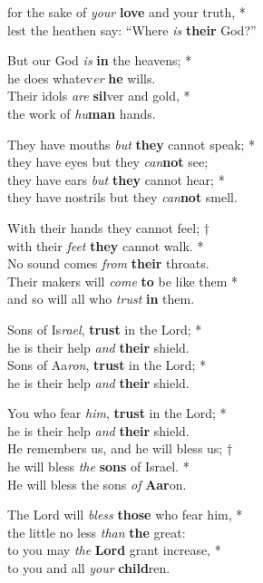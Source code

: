 for the sake of \emph{your} \textbf{love} and your truth, *\\
lest the heathen say: “Where \emph{is} \textbf{their} God?”

But our God \emph{is} \textbf{in} the heavens; *\\
he does whatev\emph{er} \textbf{he} wills.\\
Their idols \emph{are} \textbf{sil}ver and gold, *\\
the work of \emph{hu}\textbf{man} hands.

They have mouths \emph{but} \textbf{they} cannot speak; *\\
they have eyes but they \emph{can}\textbf{not} see;\\
they have ears \emph{but} \textbf{they} cannot hear; *\\
they have nostrils but they \emph{can}\textbf{not} smell.

With their hands they cannot feel; †\\
with their \emph{feet} \textbf{they} cannot walk. *\\
No sound comes \emph{from} \textbf{their} throats.\\
Their makers will \emph{come} \textbf{to} be like them *\\
and so will all who \emph{trust} \textbf{in} them.

Sons of Is\emph{rael}, \textbf{trust} in the Lord; *\\
he is their help \emph{and} \textbf{their} shield.\\
Sons of Aa\emph{ron}, \textbf{trust} in the Lord; *\\
he is their help \emph{and} \textbf{their} shield.

You who fear \emph{him}, \textbf{trust} in the Lord; *\\
he is their help \emph{and} \textbf{their} shield.\\
He remembers us, and he will bless us; †\\
he will bless \emph{the} \textbf{sons} of Israel. *\\
He will bless the sons \emph{of} \textbf{Aar}on.

The Lord will \emph{bless} \textbf{those} who fear him, *\\
the little no less \emph{than} \textbf{the} great:\\
to you may \emph{the} \textbf{Lord} grant increase, *\\
to you and all \emph{your} \textbf{child}ren.

